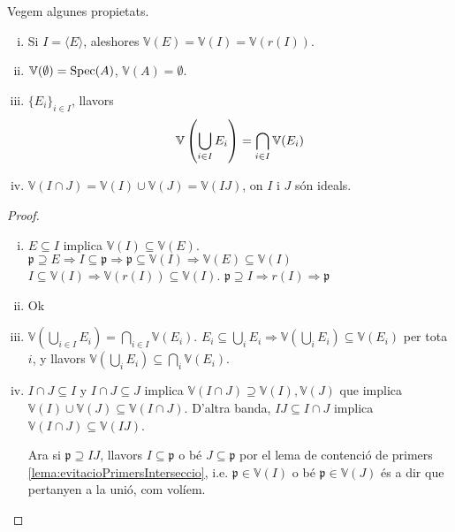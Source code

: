 \documentclass[../../../main.tex]{subfiles}
\begin{document}
\begin{prop}
Vegem algunes propietats.
\begin{enumerate}[(i)]
    \item Si $I = \langle E\rangle$, aleshores $\mathbb{V}(E) = \mathbb{V}(I) = \mathbb{V}(r(I))$.
    \item $\mathbb{V}(\emptyset) = \mathrm{Spec}(A)$, $\mathbb{V}(A) = \emptyset$.
    \item $\{E_i\}_{i\in I}$, llavors
    \begin{equation}
        \notag
        \mathbb{V}\left(\bigcup_{i\in I}E_i\right) = \bigcap_{i\in I}\mathbb{V}(E_i)
    \end{equation}
    \item $\mathbb{V}(I\cap J) = \mathbb{V}(I)\cup\mathbb{V}(J) = \mathbb{V}(IJ)$, on $I$ i $J$ són ideals.
\end{enumerate}
\end{prop}
\begin{proof}
\begin{enumerate}[(i)]
    \item $E\subseteq I$ implica $\mathbb{V}(I)\subseteq \mathbb{V}(E)$. $\mathfrak{p}\supseteq E\Rightarrow I\subseteq \mathfrak{p}\Rightarrow \mathfrak{p}\subseteq\mathbb{V}(I)\Rightarrow \mathbb{V}(E)\subseteq \mathbb{V}(I)$
    $I\subseteq \mathbb{V}(I)\Rightarrow \mathbb{V}(r(I))\subseteq \mathbb{V}(I)$. $\mathfrak{p}\supseteq I\Rightarrow r(I)\Rightarrow \mathfrak{p}$
    \item Ok
    \item $\mathbb{V}(\bigcup_{i\in I} E_i)=\bigcap_{i\in I}\mathbb{V}(E_i)$. $E_i\subseteq\bigcup_i E_i\Rightarrow \mathbb{V}(\bigcup_i E_i)\subseteq \mathbb{V}(E_i)$ per tota $i$, y llavors $\mathbb{V}(\bigcup_i E_i)\subseteq\bigcap_i\mathbb{V}(E_i)$.
    \item $I\cap J\subseteq I$ y $I\cap J\subseteq J$ implica $\mathbb{V}(I\cap J)\supseteq \mathbb{V}(I),\mathbb{V}(J)$ que implica $\mathbb{V}(I)\cup\mathbb{V}(J)\subseteq\mathbb{V}(I\cap J)$. D'altra banda, $IJ\subseteq I\cap J$ implica $\mathbb{V}(I\cap J)\subseteq \mathbb{V}(IJ)$.
    
    Ara si $\mathfrak{p}\supseteq IJ$, llavors $I\subseteq \mathfrak{p}$ o bé $J\subseteq \mathfrak{p}$ por el lema de contenció de primers \ref{lema:evitacioPrimersInterseccio}, i.e. $\mathfrak{p}\in \mathbb{V}(I)$ o bé $\mathfrak{p}\in \mathbb{V}(J)$ és a dir que pertanyen a la unió, com volíem.
\end{enumerate}
\end{proof}
\end{document}
